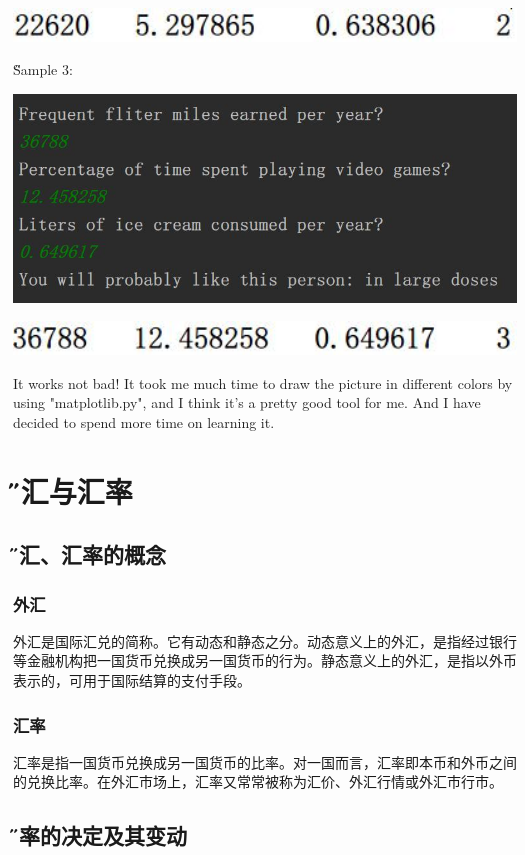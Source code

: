 \documentclass[12pt]{article}
\begin{document}
\includegraphics[width=5.5in]{4.jpg}

\H{Sample 3:}

\includegraphics[width=5.5in]{7.jpg}

\includegraphics[width=5.5in]{6.jpg}

It works not bad! It took me much time to draw the picture in different colors by using "matplotlib.py", and I think it's a pretty good tool for me. And I have decided to spend more time on learning it.

\section{\H 外汇与汇率}
\subsection{\H 外汇、汇率的概念}
\subsubsection{外汇}
外汇是国际汇兑的简称。它有动态和静态之分。动态意义上的外汇，是指经过银行等金融机构把一国货币兑换成另一国货币的行为。静态意义上的外汇，是指以外币表示的，可用于国际结算的支付手段。
\subsubsection{汇率}
汇率是指一国货币兑换成另一国货币的比率。对一国而言，汇率即本币和外币之间的兑换比率。在外汇市场上，汇率又常常被称为汇价、外汇行情或外汇市行市。

\subsection{\H 汇率的决定及其变动}
\end{document}
